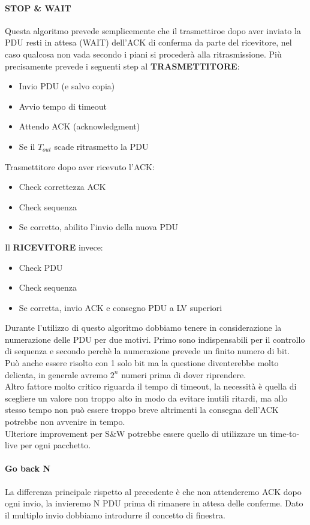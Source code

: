 \documentclass[12pt]{article}
\begin{document}
\paragraph{STOP \& WAIT}
Questa algoritmo prevede semplicemente che il trasmettiroe dopo aver inviato la PDU resti in attesa (WAIT) dell'ACK di conferma da parte del ricevitore, nel caso qualcosa non vada secondo i piani si procederà alla ritrasmissione. Più precisamente prevede i seguenti step al \textbf{TRASMETTITORE}:
\begin{itemize}
  \item Invio PDU (e salvo copia)
  \item Avvio tempo di timeout
  \item Attendo ACK (acknowledgment)
  \item Se il $T_{out}$ scade ritrasmetto la PDU
\end{itemize}
Trasmettitore dopo aver ricevuto l'ACK:
\begin{itemize}
  \item Check correttezza ACK
  \item Check sequenza
  \item Se corretto, abilito l'invio della nuova PDU
\end{itemize}
Il \textbf{RICEVITORE} invece:
\begin{itemize}
  \item Check PDU
  \item Check sequenza
  \item Se corretta, invio ACK e consegno PDU a LV superiori
\end{itemize}
Durante l'utilizzo di questo algoritmo dobbiamo tenere in considerazione la numerazione delle PDU per due motivi. Primo sono indispensabili per il controllo di sequenza e secondo perchè la numerazione prevede un finito numero di bit. Può anche essere risolto con 1 solo bit ma la questione diventerebbe molto delicata, in generale avremo $2^n$ numeri prima di dover riprendere.\\
Altro fattore molto critico riguarda il tempo di timeout, la necessità è quella di scegliere un valore non troppo alto in modo da evitare inutili ritardi, ma allo stesso tempo non può essere troppo breve altrimenti la consegna dell'ACK potrebbe non avvenire in tempo.\\
Ulteriore improvement per S\&W potrebbe essere quello di utilizzare un time-to-live per ogni pacchetto.

\paragraph{Go back N}
La differenza principale rispetto al precedente è che non attenderemo ACK dopo ogni invio, la invieremo N PDU prima di rimanere in attesa delle conferme. Dato il multiplo invio dobbiamo introdurre il concetto di finestra.\\
\end{document}
